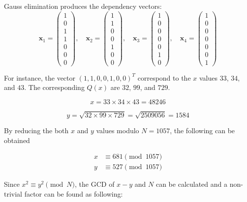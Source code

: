 \documentclass[11pt,a4paper]{article}
\begin{document}
Gauss elimination produces the dependency vectors:
\[
\mathbf{x}_1 = \begin{pmatrix} 1 \\ 0 \\ 1 \\ 1 \\ 0 \\ 0 \\ 0 \end{pmatrix}, \quad
\mathbf{x}_2 = \begin{pmatrix} 1 \\ 1 \\ 0 \\ 0 \\ 1 \\ 0 \\ 0 \end{pmatrix}, \quad
\mathbf{x}_3 = \begin{pmatrix} 1 \\ 0 \\ 0 \\ 0 \\ 0 \\ 1 \\ 0 \end{pmatrix}, \quad
\mathbf{x}_4 = \begin{pmatrix} 1 \\ 0 \\ 0 \\ 0 \\ 0 \\ 0 \\ 1 \end{pmatrix}
\]


For instance, the vector $(1, 1, 0, 0, 1, 0, 0)^T$ correspond to the $x$ values $33$, $34$, and $43$. The corresponding $Q(x)$ are $32$, $99$, and $729$.

\[
x = 33 \times 34 \times 43 = 48246
\]

\[
y = \sqrt{32 \times 99 \times 729} = \sqrt{2509056} = 1584
\]

By reducing the both $x$ and $y$ values modulo \(N=1057\), the following can be obtained

\[
\begin{aligned}
x&\equiv681\pmod{1057}\\
y&\equiv527\pmod{1057}
\end{aligned}
\]

Since $x^2\equiv y^2\pmod N$, the GCD of $x-y$ and $N$ can be calculated and a non-trivial factor can be found as following:
\end{document}
